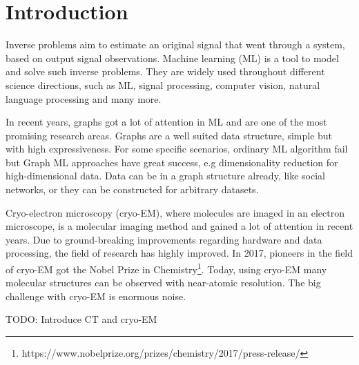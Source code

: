 \chapter{Introduction}
\label{sec:introduction}

Inverse problems aim to estimate an original signal that went through a system, based on output signal observations.
Machine learning (ML) is a tool to model and solve such inverse problems.
They are widely used throughout different science directions, such as ML,
signal processing, computer vision, natural language processing and many more.

In recent years, graphs got a lot of attention in ML and are one of the most promising research areas.
Graphs are a well suited data structure, simple but with high expressiveness. 
For some specific scenarios, ordinary ML algorithm fail but Graph ML approaches have great success, e.g dimensionality reduction for high-dimensional data.
Data can be in a graph structure already, like social networks, or they can be constructed for arbitrary datasets.

Cryo-electron microscopy (cryo-EM), where molecules are imaged in an electron microscope,
is a molecular imaging method and gained a lot of attention in recent years. 
Due to ground-breaking improvements regarding hardware and data processing, the field of research
has highly improved. In 2017, pioneers in the field of cryo-EM got the 
Nobel Prize in Chemistry\footnote{https://www.nobelprize.org/prizes/chemistry/2017/press-release/}.
Today, using cryo-EM many molecular structures can be observed with near-atomic resolution.
The big challenge with cryo-EM is enormous noise.

TODO: Introduce CT and cryo-EM



